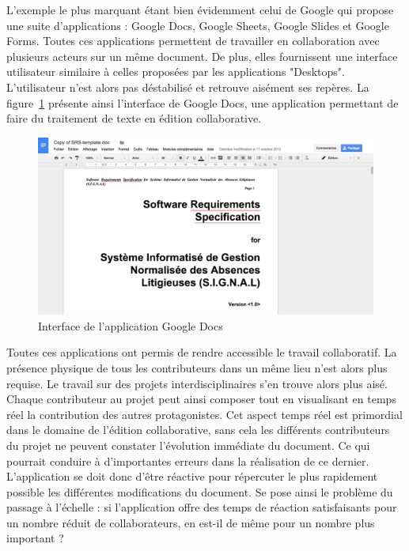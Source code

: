 \documentclass{tnreport}
\begin{document}
L'exemple le plus marquant étant bien évidemment celui de Google qui propose une suite d'applications : Google Docs, Google Sheets, 
Google Slides et Google Forms. Toutes ces applications permettent de travailler en collaboration avec plusieurs acteurs sur un même 
document. De plus, elles fournissent une interface utilisateur similaire à celles proposées par les applications "Desktops". 
L'utilisateur n'est alors pas déstabilisé et retrouve aisément ses repères. La figure~\ref{fig:g-doc} présente ainsi l'interface de 
Google Docs, une application permettant de faire du traitement de texte en édition collaborative.


\begin{figure}[h]
  \centering
  \includegraphics[width=15cm]{figures/gdoc}
  \caption{Interface de l'application Google Docs}
  \label{fig:g-doc}
\end{figure}

Toutes ces applications ont permis de rendre accessible le travail collaboratif. La présence physique de tous les contributeurs dans 
un même lieu n'est alors plus requise. Le travail sur des projets interdisciplinaires s'en trouve alors plus aisé. Chaque contributeur 
au projet peut ainsi composer tout en visualisant en temps réel la contribution des autres protagonistes. Cet aspect temps réel est 
primordial dans le domaine de l'édition collaborative, sans cela les différents contributeurs du projet ne peuvent constater 
l'évolution immédiate du document. Ce qui pourrait conduire à d'importantes erreurs dans la réalisation de ce dernier. L'application se doit donc d'être réactive pour répercuter le plus rapidement possible les différentes modifications du document. Se pose ainsi le 
problème du passage à l'échelle : si l'application offre des temps de réaction satisfaisants pour un nombre réduit de collaborateurs, 
en est-il de même pour un nombre plus important ? 
\end{document}

